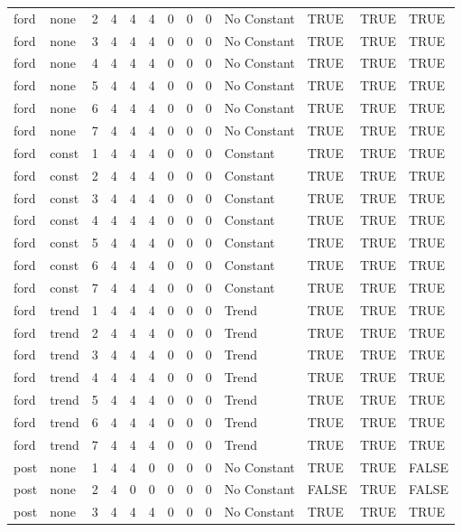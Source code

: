 \begin{longtable}[t]{llrrrrrrrllll}
ford & none & 2 & 4 & 4 & 4 & 0 & 0 & 0 & No Constant & TRUE & TRUE & TRUE\\
ford & none & 3 & 4 & 4 & 4 & 0 & 0 & 0 & No Constant & TRUE & TRUE & TRUE\\
ford & none & 4 & 4 & 4 & 4 & 0 & 0 & 0 & No Constant & TRUE & TRUE & TRUE\\
\addlinespace
ford & none & 5 & 4 & 4 & 4 & 0 & 0 & 0 & No Constant & TRUE & TRUE & TRUE\\
ford & none & 6 & 4 & 4 & 4 & 0 & 0 & 0 & No Constant & TRUE & TRUE & TRUE\\
ford & none & 7 & 4 & 4 & 4 & 0 & 0 & 0 & No Constant & TRUE & TRUE & TRUE\\
ford & const & 1 & 4 & 4 & 4 & 0 & 0 & 0 & Constant & TRUE & TRUE & TRUE\\
ford & const & 2 & 4 & 4 & 4 & 0 & 0 & 0 & Constant & TRUE & TRUE & TRUE\\
\addlinespace
ford & const & 3 & 4 & 4 & 4 & 0 & 0 & 0 & Constant & TRUE & TRUE & TRUE\\
ford & const & 4 & 4 & 4 & 4 & 0 & 0 & 0 & Constant & TRUE & TRUE & TRUE\\
ford & const & 5 & 4 & 4 & 4 & 0 & 0 & 0 & Constant & TRUE & TRUE & TRUE\\
ford & const & 6 & 4 & 4 & 4 & 0 & 0 & 0 & Constant & TRUE & TRUE & TRUE\\
ford & const & 7 & 4 & 4 & 4 & 0 & 0 & 0 & Constant & TRUE & TRUE & TRUE\\
\addlinespace
ford & trend & 1 & 4 & 4 & 4 & 0 & 0 & 0 & Trend & TRUE & TRUE & TRUE\\
ford & trend & 2 & 4 & 4 & 4 & 0 & 0 & 0 & Trend & TRUE & TRUE & TRUE\\
ford & trend & 3 & 4 & 4 & 4 & 0 & 0 & 0 & Trend & TRUE & TRUE & TRUE\\
ford & trend & 4 & 4 & 4 & 4 & 0 & 0 & 0 & Trend & TRUE & TRUE & TRUE\\
ford & trend & 5 & 4 & 4 & 4 & 0 & 0 & 0 & Trend & TRUE & TRUE & TRUE\\
\addlinespace
ford & trend & 6 & 4 & 4 & 4 & 0 & 0 & 0 & Trend & TRUE & TRUE & TRUE\\
ford & trend & 7 & 4 & 4 & 4 & 0 & 0 & 0 & Trend & TRUE & TRUE & TRUE\\
post & none & 1 & 4 & 4 & 0 & 0 & 0 & 0 & No Constant & TRUE & TRUE & FALSE\\
post & none & 2 & 4 & 0 & 0 & 0 & 0 & 0 & No Constant & FALSE & TRUE & FALSE\\
post & none & 3 & 4 & 4 & 4 & 0 & 0 & 0 & No Constant & TRUE & TRUE & TRUE\\

\end{longtable}
